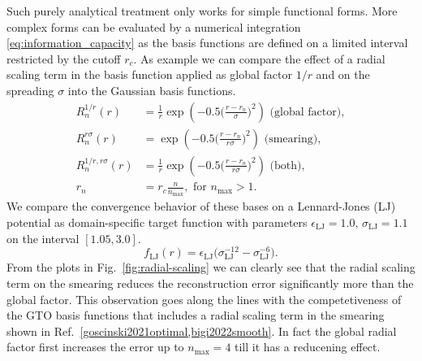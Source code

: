 Such purely analytical treatment only works for simple functional forms.
More complex forms can be evaluated by a numerical integration \ref{eq:information_capacity} as the basis functions are defined on a limited interval restricted by the cutoff $r_c$.
As example we can compare the effect of a radial scaling term in the basis function applied as global factor $1/r$ and on the spreading $\sigma$ into the Gaussian basis functions.
\begin{subequations}
\begin{align}
  R^{1/r}_n(r) &= \frac{1}{r}\exp(-0.5\big(\frac{r-r_n}{\sigma}\big)^2)\textrm{ (global factor)},\\
  R^{r\sigma}_n(r) &= \exp(-0.5\big(\frac{r-r_n}{r\sigma}\big)^2)\textrm{ (smearing)},\\
  R^{1/r,r\sigma}_n(r) &= \frac{1}{r}\exp(-0.5\big(\frac{r-r_n}{r\sigma}\big)^2)\textrm{ (both)},\\
  r_n &= r_c\frac{n}{n_\textrm{max}},\textrm{ for }n_\textrm{max}>1.
\end{align}
\end{subequations}
We compare the convergence behavior of these bases on a Lennard-Jones (LJ) potential as domain-specific target function with parameters $\epsilon_\textrm{LJ}=1.0$, $\sigma_\textrm{LJ}=1.1$ on the interval $[1.05, 3.0]$.
\begin{equation}
  f_\textrm{LJ}(r) = \epsilon_\textrm{LJ}\big(\sigma_\textrm{LJ}^{-12}-\sigma_\textrm{LJ}^{-6}\big).
\end{equation}
From the plots in Fig.~\ref{fig:radial-scaling} we can clearly see that the radial scaling term on the smearing reduces the reconstruction error significantly more than the global factor.
This observation goes along the lines with the competetiveness of the GTO basis functions that includes a radial scaling term in the smearing shown in Ref.~\ref{goscinski2021optimal,bigi2022smooth}.
In fact the global radial factor first increases the error up to $n_\textrm{max}=4$ till it has a reducening effect.

